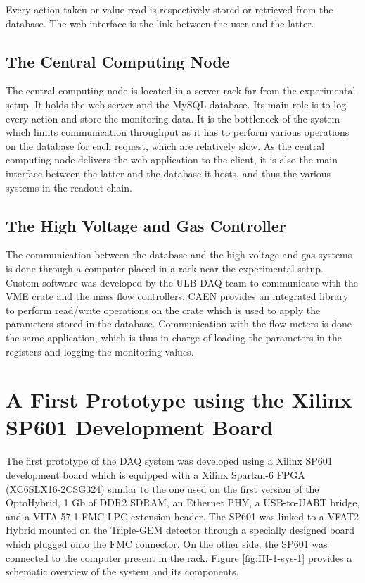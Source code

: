       Every action taken or value read is respectively stored or retrieved from the database. The web interface is the link between the user and the latter.

    \subsection{The Central Computing Node}

      The central computing node is located in a server rack far from the experimental setup. It holds the web server and the MySQL database. Its main role is to log every action and store the monitoring data. It is the bottleneck of the system which limits communication throughput as it has to perform various operations on the database for each request, which are relatively slow. As the central computing node delivers the web application to the client, it is also the main interface between the latter and the database it hosts, and thus the various systems in the readout chain.

    \subsection{The High Voltage and Gas Controller}

      The communication between the database and the high voltage and gas systems is done through a computer placed in a rack near the experimental setup. Custom software was developed by the ULB DAQ team to communicate with the VME crate and the mass flow controllers. CAEN provides an integrated library to perform read/write operations on the crate which is used to apply the parameters stored in the database. Communication with the flow meters is done the same application, which is thus in charge of loading the parameters in the registers and logging the monitoring values.

  \section{A First Prototype using the Xilinx SP601 Development Board}

    The first prototype of the DAQ system was developed using a Xilinx SP601 development board which is equipped with a Xilinx Spartan-6 FPGA (XC6SLX16-2CSG324) similar to the one used on the first version of the OptoHybrid, 1 Gb of DDR2 SDRAM, an Ethernet PHY, a USB-to-UART bridge, and a VITA 57.1 FMC-LPC extension header. The SP601 was linked to a VFAT2 Hybrid mounted on the Triple-GEM detector through a specially designed board which plugged onto the FMC connector. On the other side, the SP601 was connected to the computer present in the rack. Figure \ref{fig:III-1-sys-1} provides a schematic overview of the system and its components.

